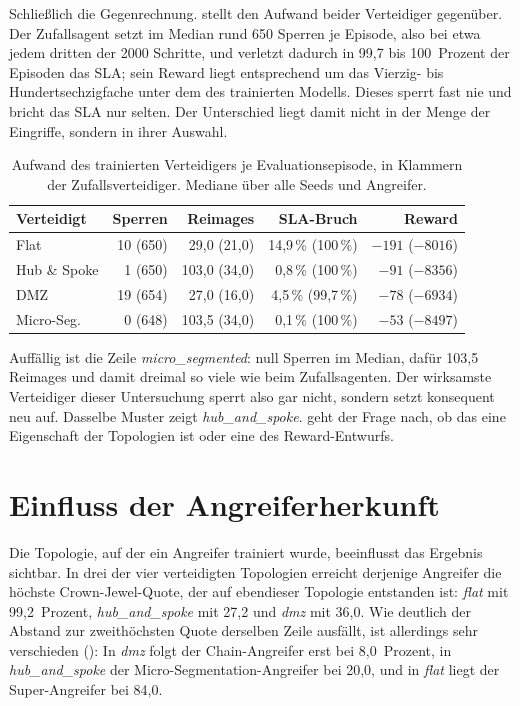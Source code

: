 Schließlich die Gegenrechnung.  stellt den Aufwand beider
Verteidiger gegenüber. Der Zufallsagent setzt im Median rund 650 Sperren
je Episode, also bei etwa jedem dritten der 2000 Schritte, und verletzt
dadurch in 99,7 bis 100~Prozent der Episoden das \ac{SLA}; sein Reward liegt
entsprechend um das Vierzig- bis Hundertsechzigfache unter dem des
trainierten Modells. Dieses sperrt fast nie und bricht das \ac{SLA} nur
selten. Der Unterschied liegt damit nicht in der Menge der Eingriffe, sondern
in ihrer Auswahl.

\begin{table}[H]
  \centering
  \caption[Aufwand der Verteidigung]{Aufwand des trainierten Verteidigers je
  Evaluationsepisode, in Klammern der Zufallsverteidiger. Mediane über alle
  Seeds und Angreifer.}
  \label{tab:kosten}
  \small
  \begin{tabular}{lrrrr}
    \toprule
    Verteidigt & Sperren & Reimages & \ac{SLA}-Bruch & Reward \\
    \midrule
    Flat         & 10 (650) & 29,0 (21,0)  & 14,9\,\% (100\,\%)  & $-191$ ($-8016$) \\
    Hub \& Spoke & 1 (650)  & 103,0 (34,0) & 0,8\,\% (100\,\%)   & $-91$ ($-8356$)  \\
    DMZ          & 19 (654) & 27,0 (16,0)  & 4,5\,\% (99,7\,\%)  & $-78$ ($-6934$)  \\
    Micro-Seg.   & 0 (648)  & 103,5 (34,0) & 0,1\,\% (100\,\%)   & $-53$ ($-8497$)  \\
    \bottomrule
  \end{tabular}
\end{table}

Auffällig ist die Zeile \emph{micro\_segmented}: null Sperren im Median, dafür 103,5
Reimages und damit dreimal so viele wie beim Zufallsagenten. Der wirksamste
Verteidiger dieser Untersuchung sperrt also gar nicht, sondern setzt konsequent
neu auf. Dasselbe Muster zeigt \emph{hub\_and\_spoke}.  geht
der Frage nach, ob das eine Eigenschaft der Topologien ist oder eine des
Reward-Entwurfs.

\section{Einfluss der Angreiferherkunft}
\label{sec:angreiferherkunft}

Die Topologie, auf der ein Angreifer trainiert wurde, beeinflusst das Ergebnis
sichtbar. In drei der vier verteidigten Topologien erreicht derjenige Angreifer
die höchste Crown-Jewel-Quote, der auf ebendieser Topologie entstanden ist:
\emph{flat} mit 99,2~Prozent, \emph{hub\_and\_spoke} mit 27,2 und \emph{dmz} mit 36,0. Wie deutlich
der Abstand zur zweithöchsten Quote derselben Zeile ausfällt, ist
allerdings sehr verschieden (): In \emph{dmz} folgt der Chain-Angreifer erst bei 8,0~Prozent, in
\emph{hub\_and\_spoke} der Micro-Segmentation-Angreifer bei 20,0, und in \emph{flat} liegt der
Super-Angreifer bei 84,0.

